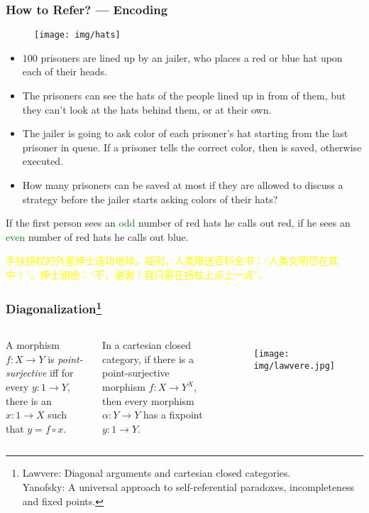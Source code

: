 \documentclass[UTF8,11pt,colorlinks,compress,openany]{beamer}%
\begin{document}
\begin{frame}\frametitle{How to Refer? --- Encoding}
	\begin{figure}
		\centering \texttt{[image: img/hats]}
	\end{figure}
	\begin{itemize}
		\item $100$ prisoners are lined up by an jailer, who places a red or blue hat upon each of their heads.
		\item The prisoners can see the hats of the people lined up in from of them, but they can't look at the hats behind them, or at their own.
		\item The jailer is going to ask color of each prisoner's hat starting from the last prisoner in queue. If a prisoner tells the correct color, then is saved, otherwise executed.
		\item How many prisoners can be saved at most if they are allowed to discuss a strategy before the jailer starts asking colors of their hats?
	\end{itemize}
	\begin{block}{}
		If the first person sees an \textcolor{green}{odd} number of red hats he calls out red, if he sees an \textcolor{green}{even} number of red hats he calls out blue.
	\end{block}
\begin{block}{}
\small \textcolor{yellow}{手扶拐杖的外星绅士造访地球。临别，人类赠送百科全书：“人类文明尽在其中！”。绅士谢绝：“不，谢谢！我只需在拐杖上点上一点”。}
\end{block}
\end{frame}

\begin{frame}\frametitle{Diagonalization\footnote{\tiny Lawvere: Diagonal arguments and cartesian closed categories.\\
Yanofsky: A universal approach to self-referential paradoxes, incompleteness and fixed points.}}
\setlength\abovedisplayskip{0pt}
\setlength\belowdisplayskip{0pt}
\begin{columns}
\begin{definition}
A morphism $f: X\to Y$ is \emph{point-surjective} iff for every $y: 1\to Y$, there is an $x: 1\to X$ such that $y=f\circ x$.
\end{definition}
	\begin{theorem}
		In a cartesian closed category, if there is a point-surjective morphism $f: X\to Y^X$, then every morphism $\alpha: Y\to Y$ has a fixpoint $y: 1\to Y$.
	\end{theorem}
	\begin{figure}
		\texttt{[image: img/lawvere.jpg]}
	\end{figure}
\end{columns}
\end{frame}
\end{document}
